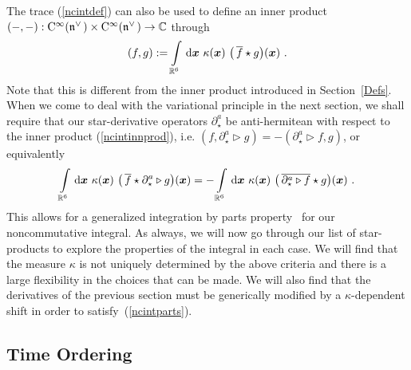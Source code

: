 \documentclass[11pt,a4paper]{article}
\newcommand{\1}{\mathbb{1}}
\newcommand{\mbf}[1]{{\boldsymbol {#1} }}
\def\dd{{\rm d}}
\def\CC{{\rm C}}
\def\mfn{{\mathfrak n}}
\newcommand{\R}{\real}
\newcommand{\complex}{{\mathbb C}} %
\newcommand{\real}{{\mathbb R}} %
\newcommand{\beq}{\begin{eqnarray}}
\newcommand{\eeq}{\end{eqnarray}}
\begin{document}
The trace (\ref{ncintdef}) can also be used to define an inner product
$(-,-):\CC^\infty(\mfn^{\vee\,})\times\CC^\infty(\mfn^{\vee\,})\to\complex$
through
\beq
(f,g):=\int\limits_{\R^6}\,\dd\mbf x~\kappa(\mbf x)~\bigl(\,\overline{f}\star
g\bigr)(\mbf x) \ .
\label{ncintinnprod}\eeq
Note that this is different from the inner product introduced in
Section~\ref{Defs}. When we come to deal with the variational
principle in the next section, we shall require that our
star-derivative operators $\partial^a_\star$ be anti-hermitean with
respect to the inner product (\ref{ncintinnprod}),
i.e. $(f,\partial^a_\star\triangleright
g)=-(\partial^a_\star\triangleright f,g)$, or equivalently
\beq
\int\limits_{\R^6}\,\dd\mbf x~\kappa(\mbf x)~\bigl(\,\overline{f}\star
\partial_\star^a
\triangleright g\bigr)(\mbf x)=-\int\limits_{\R^6}\,\dd\mbf x~\kappa(\mbf x)~
\bigl(\,\overline{\partial_\star^a\triangleright f}\star g\bigr)(\mbf x) \ .
\label{ncintparts}\eeq
This allows for a generalized integration by parts
property~\cite{DJMTWW1} for our noncommutative integral. As always, we
will now go through our list of star-products to explore the
properties of the integral in each case. We will find that the measure
$\kappa$ is not uniquely determined by the above criteria and there is
a large flexibility in the choices that can be made. We will also find
that the derivatives of the previous section must be generically
modified by a $\kappa$-dependent shift in order to
satisfy~(\ref{ncintparts}).

\subsection{Time Ordering\label{TOint}}
\end{document}
